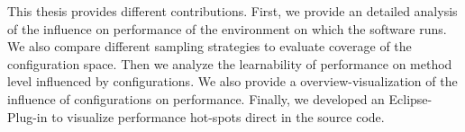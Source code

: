 
This thesis provides different contributions. First, we provide an detailed analysis of the influence on performance of the environment on which the software runs. We also compare different sampling strategies to evaluate coverage of the configuration space. Then we analyze the learnability of performance on method level influenced by configurations. We also provide a overview-visualization of the influence of configurations on performance. Finally, we developed an Eclipse-Plug-in to visualize performance hot-spots direct in the source code.

